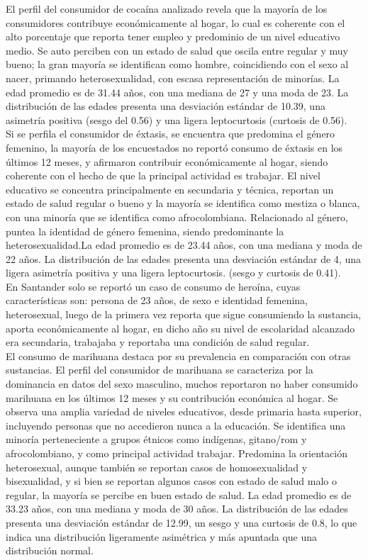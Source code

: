 \documentclass[
]{article}
\begin{document}
El perfil del consumidor de cocaína analizado revela que la mayoría de
los consumidores contribuye económicamente al hogar, lo cual es
coherente con el alto porcentaje que reporta tener empleo y predominio
de un nivel educativo medio. Se auto perciben con un estado de salud que
oscila entre regular y muy bueno; la gran mayoría se identifican como
hombre, coincidiendo con el sexo al nacer, primando heterosexualidad,
con escasa representación de minorías. La edad promedio es de 31.44
años, con una mediana de 27 y una moda de 23. La distribución de las
edades presenta una desviación estándar de 10.39, una asimetría positiva
(sesgo del 0.56) y una ligera leptocurtosis (curtosis de 0.56).\\

Si se perfila el consumidor de éxtasis, se encuentra que predomina el
género femenino, la mayoría de los encuestados no reportó consumo de
éxtasis en los últimos 12 meses, y afirmaron contribuir económicamente
al hogar, siendo coherente con el hecho de que la principal actividad es
trabajar. El nivel educativo se concentra principalmente en secundaria y
técnica, reportan un estado de salud regular o bueno y la mayoría se
identifica como mestiza o blanca, con una minoría que se identifica como
afrocolombiana. Relacionado al género, puntea la identidad de género
femenina, siendo predominante la heterosexualidad.La edad promedio es de
23.44 años, con una mediana y moda de 22 años. La distribución de las
edades presenta una desviación estándar de 4, una ligera asimetría
positiva y una ligera leptocurtosis. (sesgo y curtosis de 0.41).\\

En Santander solo se reportó un caso de consumo de heroína, cuyas
características son: persona de 23 años, de sexo e identidad femenina,
heterosexual, luego de la primera vez reporta que sigue consumiendo la
sustancia, aporta económicamente al hogar, en dicho año su nivel de
escolaridad alcanzado era secundaria, trabajaba y reportaba una
condición de salud regular.\\

El consumo de marihuana destaca por su prevalencia en comparación con
otras sustancias. El perfil del consumidor de marihuana se caracteriza
por la dominancia en datos del sexo masculino, muchos reportaron no
haber consumido marihuana en los últimos 12 meses y su contribución
económica al hogar. Se observa una amplia variedad de niveles
educativos, desde primaria hasta superior, incluyendo personas que no
accedieron nunca a la educación. Se identifica una minoría perteneciente
a grupos étnicos como indígenas, gitano/rom y afrocolombiano, y como
principal actividad trabajar. Predomina la orientación heterosexual,
aunque también se reportan casos de homosexualidad y bisexualidad, y si
bien se reportan algunos casos con estado de salud malo o regular, la
mayoría se percibe en buen estado de salud. La edad promedio es de 33.23
años, con una mediana y moda de 30 años. La distribución de las edades
presenta una desviación estándar de 12.99, un sesgo y una curtosis de
0.8, lo que indica una distribución ligeramente asimétrica y más
apuntada que una distribución normal.\\
\strut \\
\end{document}
